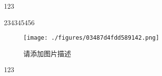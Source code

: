
123

234345456

\begin{figure}[ht]
\centering
\texttt{[image: ./figures/03487d4fdd589142.png]}
\caption{请添加图片描述} \label{fig_qwijdh_1}
\end{figure}

123
